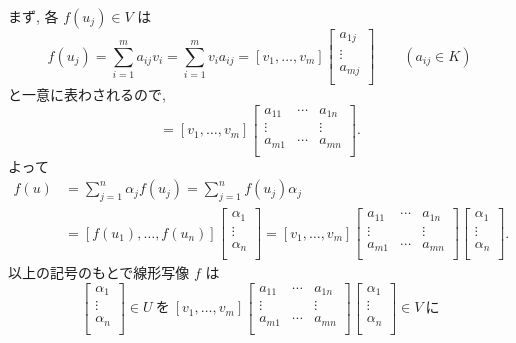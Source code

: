 \documentclass[12pt,twoside]{jarticle}
\begin{document}
まず, 各 $f(u_j)\in V$ は
\begin{equation*}
  f(u_j)
  = \sum_{i=1}^m a_{ij} v_i 
  = \sum_{i=1}^m v_i a_{ij}
  =
  [v_1,\ldots,v_m]
  \begin{bmatrix}
    a_{1j} \\
    \vdots \\
    a_{mj} \\
  \end{bmatrix}
  \qquad (a_{ij}\in K)
\end{equation*}
と一意に表わされるので,
\begin{equation*}
  [f(u_1),\ldots,f(u_n)] 
  =
  [v_1,\ldots,v_m]
  \begin{bmatrix}
    a_{11} & \cdots & a_{1n} \\
    \vdots &        & \vdots \\
    a_{m1} & \cdots & a_{mn} \\
  \end{bmatrix}.
\end{equation*}
よって
\begin{align*}
  f(u)
  &
  = \sum_{j=1}^n \alpha_j f(u_j)
  = \sum_{j=1}^n f(u_j) \alpha_j
  \\ &
  =
  [f(u_1),\ldots,f(u_n)]
  \begin{bmatrix}
    \alpha_1 \\
    \vdots \\
    \alpha_n \\
  \end{bmatrix}
  =
  [v_1,\ldots,v_m]
  \begin{bmatrix}
    a_{11} & \cdots & a_{1n} \\
    \vdots &        & \vdots \\
    a_{m1} & \cdots & a_{mn} \\
  \end{bmatrix}
  \begin{bmatrix}
    \alpha_1 \\
    \vdots \\
    \alpha_n \\
  \end{bmatrix}.
\end{align*}
以上の記号のもとで線形写像 $f$ は
\begin{equation*}
  [u_1,\ldots,u_n]
  \begin{bmatrix}
    \alpha_1 \\
    \vdots \\
    \alpha_n \\
  \end{bmatrix}
  \in U
  \ \text{を}\ %
  [v_1,\ldots,v_m]
  \begin{bmatrix}
    a_{11} & \cdots & a_{1n} \\
    \vdots &        & \vdots \\
    a_{m1} & \cdots & a_{mn} \\
  \end{bmatrix}
  \begin{bmatrix}
    \alpha_1 \\
    \vdots \\
    \alpha_n \\
  \end{bmatrix}
  \in V
  \ \text{に}
\end{equation*}
\end{document}
